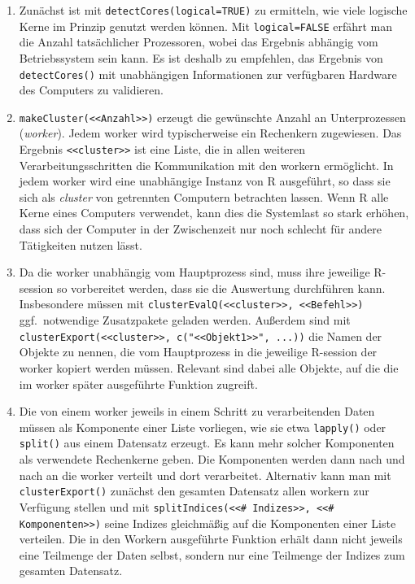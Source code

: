 \begin{enumerate}
\item Zunächst ist mit \lstinline!detectCores(logical=TRUE)! zu ermitteln, wie viele logische Kerne im Prinzip genutzt werden können. Mit \lstinline!logical=FALSE! erfährt man die Anzahl tatsächlicher Prozessoren, wobei das Ergebnis abhängig vom Betriebssystem sein kann. Es ist deshalb zu empfehlen, das Ergebnis von \lstinline!detectCores()! mit unabhängigen Informationen zur verfügbaren Hardware des Computers zu validieren.
\item \label{item:par_mc} \lstinline!makeCluster(<<Anzahl>>)! erzeugt die gewünschte Anzahl an Unterprozessen (\emph{worker}). Jedem worker wird typischerweise ein Rechenkern zugewiesen. Das Ergebnis \lstinline!<<cluster>>! ist eine Liste, die in allen weiteren Verarbeitungsschritten die Kommunikation mit den workern ermöglicht. In jedem worker wird eine unabhängige Instanz von R ausgeführt, so dass sie sich als \emph{cluster} von getrennten Computern betrachten lassen. Wenn R alle Kerne eines Computers verwendet, kann dies die Systemlast so stark erhöhen, dass sich der Computer in der Zwischenzeit nur noch schlecht für andere Tätigkeiten nutzen lässt.
\item \label{item:par_ceq} Da die worker unabhängig vom Hauptprozess sind, muss ihre jeweilige R-session so vorbereitet werden, dass sie die Auswertung durchführen kann. Insbesondere müssen mit \lstinline!clusterEvalQ(<<cluster>>, <<Befehl>>)! ggf.\ notwendige Zusatzpakete geladen werden. Außerdem sind mit \lstinline!clusterExport(<<cluster>>, c("<<Objekt1>>", ...))! die Namen der Objekte zu nennen, die vom Hauptprozess in die jeweilige R-session der worker kopiert werden müssen. Relevant sind dabei alle Objekte, auf die die im worker später ausgeführte Funktion zugreift.
\item Die von einem worker jeweils in einem Schritt zu verarbeitenden Daten müssen als Komponente einer Liste vorliegen, wie sie etwa \lstinline!lapply()! oder \lstinline!split()! aus einem Datensatz erzeugt. Es kann mehr solcher Komponenten als verwendete Rechenkerne geben. Die Komponenten werden dann nach und nach an die worker verteilt und dort verarbeitet. Alternativ kann man mit \lstinline!clusterExport()! zunächst den gesamten Datensatz allen workern zur Verfügung stellen und mit \lstinline!splitIndices(<<# Indizes>>, <<# Komponenten>>)! seine Indizes gleichmäßig auf die Komponenten einer Liste verteilen. Die in den Workern ausgeführte Funktion erhält dann nicht jeweils eine Teilmenge der Daten selbst, sondern nur eine Teilmenge der Indizes zum gesamten Datensatz.

\end{enumerate}

